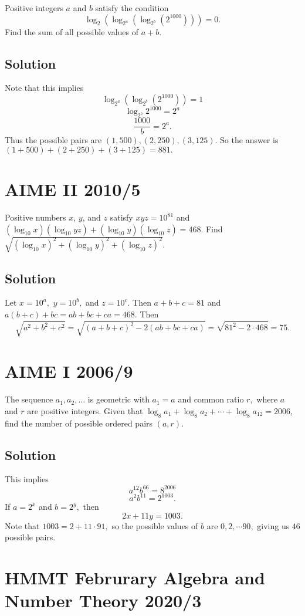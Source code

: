 \documentclass{article}
\begin{document}
Positive integers $a$ and $b$ satisfy the condition \[\log_2(\log_{2^a}(\log_{2^b}(2^{1000}))) = 0.\] Find the sum of all possible values of $a+b$.

\subsection{Solution}

Note that this implies
\[\log_{2^a}(\log_{2^b}(2^{1000}))=1\]
\[\log_{2^b}2^{1000}=2^a\]
\[\frac{1000}{b}=2^a.\]
Thus the possible pairs are $(1,500),(2,250),(3,125).$ So the answer is $(1+500)+(2+250)+(3+125)=881.$

\pagebreak\section{AIME II 2010/5}

Positive numbers $x$, $y$, and $z$ satisfy $xyz = 10^{81}$ and $(\log_{10}x)(\log_{10} yz) + (\log_{10}y) (\log_{10}z) = 468$. Find $\sqrt {(\log_{10}x)^2 + (\log_{10}y)^2 + (\log_{10}z)^2}$.

\subsection{Solution}

Let $x=10^a,$ $y=10^b,$ and $z=10^c.$ Then $a+b+c=81$ and $a(b+c)+bc=ab+bc+ca=468.$ Then
\[\sqrt{a^2+b^2+c^2}=\sqrt{(a+b+c)^2-2(ab+bc+ca)}=\sqrt{81^2-2\cdot 468}=75.\]

\pagebreak\section{AIME I 2006/9}

The sequence $a_1, a_2, \ldots$ is geometric with $a_1=a$ and common ratio $r,$ where $a$ and $r$ are positive integers. Given that $\log_8 a_1+\log_8 a_2+\cdots+\log_8 a_{12} = 2006,$ find the number of possible ordered pairs $(a,r).$

\subsection{Solution}

This implies
\[a^{12}b^{66}=8^{2006}\]
\[a^2b^{11}=2^{1003}.\]
If $a=2^x$ and $b=2^y,$ then
\[2x+11y=1003.\]
Note that $1003=2+11\cdot 91,$ so the possible values of $b$ are $0,2,\cdots 90,$ giving us $46$ possible pairs.

\pagebreak\section{HMMT Februrary Algebra and Number Theory 2020/3}
\end{document}
